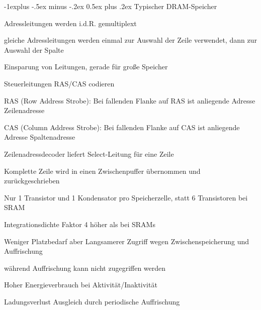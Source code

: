 \documentclass[a4paper]{article}
\makeatletter
\renewcommand{\subsection}{\@startsection{subsection}{2}{0mm}%
                                {-1explus -.5ex minus -.2ex}%
                                {0.5ex plus .2ex}%
                                {\normalfont\normalsize\bfseries}}
\makeatother
\begin{document}
\begin{multicols}{3}
  \subsection{Typischer DRAM-Speicher}
  \begin{itemize*}
    \item Adressleitungen werden i.d.R. gemultiplext
    \item gleiche Adressleitungen werden einmal zur Auswahl der Zeile verwendet, dann zur Auswahl der Spalte
    \item Einsparung von Leitungen, gerade für große Speicher
    \item Steuerleitungen RAS/CAS codieren
    \item RAS (Row Address Strobe): Bei fallenden Flanke auf RAS ist anliegende Adresse Zeilenadresse
    \item CAS (Column Address Strobe): Bei fallenden Flanke auf CAS ist anliegende Adresse Spaltenadresse
    \item Zeilenadressdecoder liefert Select-Leitung für eine Zeile
    \item Komplette Zeile wird in einen Zwischenpuffer übernommen und zurückgeschrieben
    \item Nur 1 Transistor und 1 Kondensator pro Speicherzelle, statt 6 Transistoren bei SRAM
    \item Integrationsdichte Faktor 4 höher als bei SRAMs
    \item Weniger Platzbedarf aber Langsamerer Zugriff wegen Zwischenspeicherung und Auffrischung
    \item während Auffrischung kann nicht zugegriffen werden
    \item Hoher Energieverbrauch bei Aktivität/Inaktivität
    \item Ladungsverlust Ausgleich durch periodische Auffrischung
  \end{itemize*}
  

\end{multicols}
\end{document}
